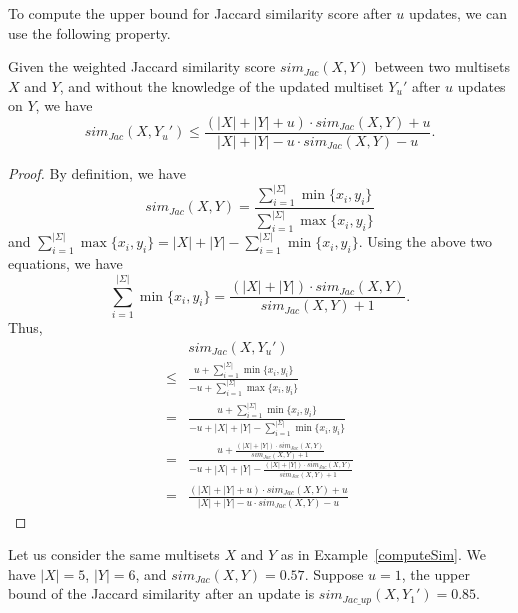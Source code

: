 To compute the upper bound for Jaccard similarity score after $u$ updates, we can use the following property.

\begin{property}%
Given the weighted Jaccard similarity score $sim_{Jac}(X, Y)$ between two multisets $X$ and $Y$, and without the knowledge of the updated multiset $Y_u'$ after $u$ updates on $Y$, we have
$$sim_{Jac}(X, Y_u') \leq \frac{(|X|+|Y|+u)\cdot sim_{Jac}(X, Y)+u}{|X|+|Y|-u\cdot sim_{Jac}(X, Y)-u}.$$
\end{property}

\begin{proof}
By definition, we have $$sim_{Jac}(X, Y) = \frac{\sum_{i=1}^{|\Sigma|} \min\{x_i, y_i\}}{\sum_{i=1}^{|\Sigma|} \max\{x_i, y_i\}}$$ and $\sum_{i=1}^{|\Sigma|} \max\{x_i, y_i\}=|X|+|Y|- \sum_{i=1}^{|\Sigma|} \min\{x_i, y_i\}$. Using the above two equations, we have $$\sum_{i=1}^{|\Sigma|} \min\{x_i, y_i\} =\frac{(|X|+|Y|)\cdot sim_{Jac}(X, Y)}{sim_{Jac}(X, Y)+1}.$$ 
Thus, 
\begin{align*}
& sim_{Jac}(X, Y_u') \\
\leq & \frac{u+\sum_{i=1}^{|\Sigma|} \min\{x_i, y_i\}}{-u+\sum_{i=1}^{|\Sigma|} \max\{x_i, y_i\}} \\
= & \frac{u+\sum_{i=1}^{|\Sigma|} \min\{x_i, y_i\}}{-u+|X|+|Y|-\sum_{i=1}^{|\Sigma|} \min\{x_i, y_i\}} \\
= & \frac{u+\frac{(|X|+|Y|)\cdot sim_{Jac}(X, Y)}{sim_{Jac}(X, Y)+1}}{-u+|X|+|Y|-\frac{(|X|+|Y|)\cdot sim_{Jac}(X, Y)}{sim_{Jac}(X, Y)+1}} \\
= & \frac{(|X|+|Y|+u)\cdot sim_{Jac}(X, Y)+u}{|X|+|Y|-u\cdot sim_{Jac}(X, Y)-u}
\end{align*}
\end{proof}

\begin{example} 
Let us consider the same multisets $X$ and $Y$ as in Example~\ref{computeSim}. We have $|X|=5$, $|Y|=6$, and $sim_{Jac}(X, Y) = 0.57$. Suppose $u=1$, the upper bound of the Jaccard similarity after an update is $sim_{Jac\_up}(X, Y_1') = 0.85$.
\end{example}


